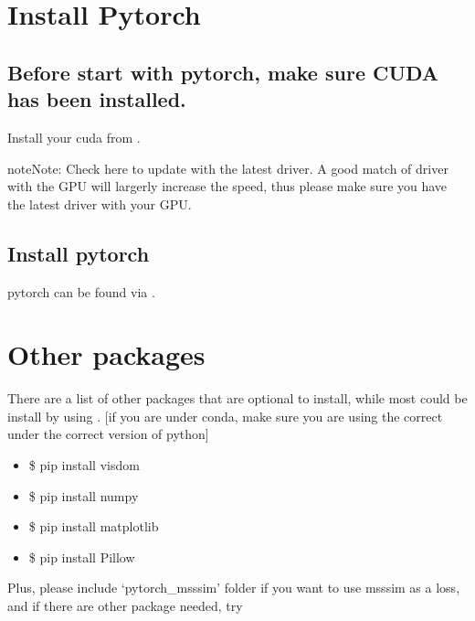 \documentclass[letterpaper,10pt,english]{sphinxmanual}
\begin{document}
\section{Install Pytorch}
\label{\detokenize{usage/installation:install-pytorch}}

\subsection{Before start with pytorch, make sure CUDA has been installed.}
\label{\detokenize{usage/installation:before-start-with-pytorch-make-sure-cuda-has-been-installed}}
Install your cuda from .

\begin{sphinxadmonition}{note}{Note:}
Check here to update with the latest driver. A good match of driver with the GPU will largerly increase the speed, thus please make sure you have the latest driver with your GPU.
\end{sphinxadmonition}


\subsection{Install pytorch}
\label{\detokenize{usage/installation:id1}}
pytorch can be found via .


\section{Other packages}
\label{\detokenize{usage/installation:other-packages}}
There are a list of other packages that are optional to install, while most could be install by using . {[}if you are under conda, make sure you are using the correct  under the correct version of python{]}
\begin{itemize}
\item {} 
\$ pip install visdom

\item {} 
\$ pip install numpy

\item {} 
\$ pip install matplotlib

\item {} 
\$ pip install Pillow

\end{itemize}

Plus, please include ‘pytorch\_msssim’ folder if you want to use msssim as a loss, and if there are other package needed, try 
\end{document}
